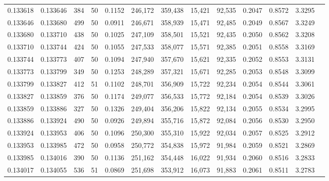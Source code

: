 \begin{tabular}{rrrrrrrrrrrrr}
0.133618 & 0.133646 &   384 &  50 &                                     0.1152 & 246,172 & 359,438 &  15,421 &  92,535 & 0.2047 & 0.8572 & 3.3295 \\
0.133646 & 0.133680 &   499 &  50 &                                     0.0911 & 246,671 & 358,939 &  15,471 &  92,485 & 0.2049 & 0.8567 & 3.3249 \\
0.133680 & 0.133710 &   438 &  50 &                                     0.1025 & 247,109 & 358,501 &  15,521 &  92,435 & 0.2050 & 0.8562 & 3.3208 \\
0.133710 & 0.133744 &   424 &  50 &                                     0.1055 & 247,533 & 358,077 &  15,571 &  92,385 & 0.2051 & 0.8558 & 3.3169 \\
0.133744 & 0.133773 &   407 &  50 &                                     0.1094 & 247,940 & 357,670 &  15,621 &  92,335 & 0.2052 & 0.8553 & 3.3131 \\
0.133773 & 0.133799 &   349 &  50 &                                     0.1253 & 248,289 & 357,321 &  15,671 &  92,285 & 0.2053 & 0.8548 & 3.3099 \\
0.133799 & 0.133827 &   412 &  51 &                                     0.1102 & 248,701 & 356,909 &  15,722 &  92,234 & 0.2054 & 0.8544 & 3.3061 \\
0.133827 & 0.133859 &   376 &  50 &                                     0.1174 & 249,077 & 356,533 &  15,772 &  92,184 & 0.2054 & 0.8539 & 3.3026 \\
0.133859 & 0.133886 &   327 &  50 &                                     0.1326 & 249,404 & 356,206 &  15,822 &  92,134 & 0.2055 & 0.8534 & 3.2995 \\
0.133886 & 0.133924 &   490 &  50 &                                     0.0926 & 249,894 & 355,716 &  15,872 &  92,084 & 0.2056 & 0.8530 & 3.2950 \\
0.133924 & 0.133953 &   406 &  50 &                                     0.1096 & 250,300 & 355,310 &  15,922 &  92,034 & 0.2057 & 0.8525 & 3.2912 \\
0.133953 & 0.133985 &   472 &  50 &                                     0.0958 & 250,772 & 354,838 &  15,972 &  91,984 & 0.2059 & 0.8521 & 3.2869 \\
0.133985 & 0.134016 &   390 &  50 &                                     0.1136 & 251,162 & 354,448 &  16,022 &  91,934 & 0.2060 & 0.8516 & 3.2833 \\
0.134017 & 0.134055 &   536 &  51 &                                     0.0869 & 251,698 & 353,912 &  16,073 &  91,883 & 0.2061 & 0.8511 & 3.2783 \\

\end{tabular}
